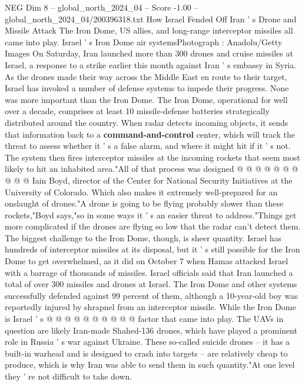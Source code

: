 \begin{textsample}{NEG Dim 8 – global\_north\_2024\_04 – Score -1.00 – global\_north\_2024\_04/200396318.txt}  \label{ex:f8_neg_402}
How Israel Fended Off Iran ' s Drone and Missile Attack The Iron Dome, US allies, and long-range interceptor missiles all came into play.
Israel ' s Iron Dome air systemsPhotograph : Anadolu/Getty Images On Saturday, Iran launched more than 300 drones and cruise missiles at Israel, a response to a strike earlier this month against Iran ' s embassy in Syria.
As the drones made their way across the Middle East en route to their target, Israel has invoked a number of defense systems to impede their progress.
None was more important than the Iron Dome.
The Iron Dome, operational for well over a decade, comprises at least 10 missile-defense batteries strategically distributed around the country.
When radar detects incoming objects, it sends that information back to a \textbf{command-and-control} center, which will track the threat to assess whether it ' s a false alarm, and where it might hit if it ' s not.
The system then fires interceptor missiles at the incoming rockets that seem most likely to hit an inhabited area."All of that process was designed @ @ @ @ @ @ @ @ @ @ Iain Boyd, director of the Center for National Security Initiatives at the University of Colorado.
Which also makes it extremely well-prepared for an onslaught of drones."A drone is going to be flying probably slower than these rockets,"Boyd says,"so in some ways it ' s an easier threat to address."Things get more complicated if the drones are flying so low that the radar can't detect them.
The biggest challenge to the Iron Dome, though, is sheer quantity.
Israel has hundreds of interceptor missiles at its disposal, but it ' s still possible for the Iron Dome to get overwhelmed, as it did on October 7 when Hamas attacked Israel with a barrage of thousands of missiles.
Israel officials said that Iran launched a total of over 300 missiles and drones at Israel.
The Iron Dome and other systems successfully defended against 99 percent of them, although a 10-year-old boy was reportedly injured by shrapnel from an interceptor missile.
While the Iron Dome is Israel ' s @ @ @ @ @ @ @ @ @ @ factor that came into play.
The UAVs in question are likely Iran-made Shahed-136 drones, which have played a prominent role in Russia ' s war against Ukraine.
These so-called suicide drones -- it has a built-in warhead and is designed to crash into targets -- are relatively cheap to produce, which is why Iran was able to send them in such quantity."At one level they ' re not difficult to take down.

\end{textsample}
